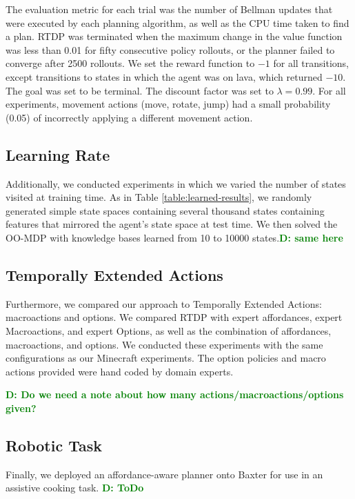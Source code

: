 \documentclass[conference]{IEEEtran}
\newcommand{\dnote}[1]{\textcolor{Green}{\textbf{D: #1}}}
\begin{document}
The evaluation metric for each trial was the
number of Bellman updates that were executed by each planning
algorithm, as well as the CPU time taken to find a plan. RTDP was terminated
when the maximum change in the value function was less than 0.01 for fifty 
consecutive policy rollouts, or the planner failed to converge after 2500 rollouts. 
We set the reward  function to $-1$ for all transitions, except transitions to states in 
which the agent was on lava, which returned $-10$. The goal was set to be 
terminal. The discount factor was set to $\lambda = 0.99$. For all experiments,
movement actions (move, rotate, jump) had a small probability (0.05) of 
incorrectly applying a different movement action.

\subsection{Learning Rate}
Additionally, we conducted experiments in which we varied the number of states visited at training time. 
As in Table \ref{table:learned-results}, we randomly generated simple state spaces
containing several thousand states containing features that mirrored the agent's state
space at test time. We then solved the OO-MDP with knowledge bases learned from 
10 to 10000 states.\dnote{same here}

\subsection{Temporally Extended Actions}
Furthermore, we compared our approach to Temporally Extended Actions: 
macroactions and options. We compared RTDP with expert affordances, 
expert Macroactions, and expert Options, as well as the combination of 
affordances, macroactions, and options. We conducted these experiments 
with the same configurations as our Minecraft experiments. The option policies
and macro actions provided were hand coded by domain experts.

\dnote{Do we need a note about how many actions/macroactions/options given?}

\subsection{Robotic Task}
Finally, we deployed an affordance-aware planner onto Baxter for use
in an assistive cooking task. \dnote{ToDo}
\end{document}
